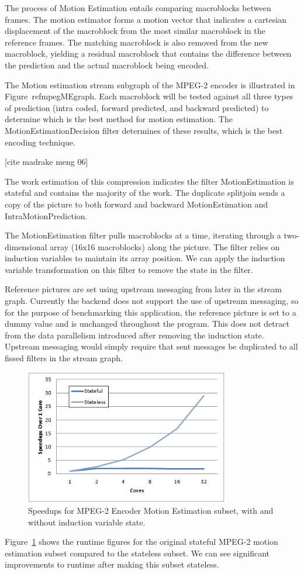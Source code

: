 The process of Motion Estimation entails comparing macroblocks between frames.  The motion estimator forms a motion vector that indicates a cartesian displacement of the macroblock from the most similar macroblock in the reference frames.  The matching macroblock is also removed from the new macroblock, yielding a residual macroblock that contains the difference between the prediction and the actual macroblock being encoded.  

The Motion estimation stream subgraph of the MPEG-2 encoder is illustrated in Figure~ref{mpegMEgraph}.  Each macroblock will be tested against all three types of prediction (intra coded, forward predicted, and backward predicted) to determine which is the best method for motion estimation.  The MotionEstimationDecision filter determines of these results, which is the best encoding technique.

[cite madrake meng 06]

The work estimation of this compression indicates the filter MotionEstimation is stateful and contains the majority of the work.  The duplicate splitjoin sends a copy of the picture to both forward and backward MotionEstimation and IntraMotionPrediction.  

The MotionEstimation filter pulls macroblocks at a time, iterating through a two-dimensional array (16x16 macroblocks) along the picture.  The filter relies on induction variables to maintain its array position.  We can apply the induction variable transformation on this filter to remove the state in the filter.

Reference pictures are set using upstream messaging from later in the stream graph.  Currently the backend does not support the use of upstream messaging, so for the purpose of benchmarking this application, the reference picture is set to a dummy value and is unchanged throughout the program.  This does not detract from the data parallelism introduced after removing the induction state.  Upstream messaging would simply require that sent messages be duplicated to all fissed filters in the stream graph.

\begin{figure}[t]
\includegraphics[width=3.5in]{figures/mpeg-results.png}
\caption{Speedups for MPEG-2 Encoder Motion Estimation subset, with and without induction variable state.  \protect\label{fig:mpeg-results}}
\end{figure}

Figure~\ref{fig:mpeg-results} shows the runtime figures for the original stateful MPEG-2 motion estimation subset compared to the stateless subset.  We can see significant improvements to runtime after making this subset stateless.  